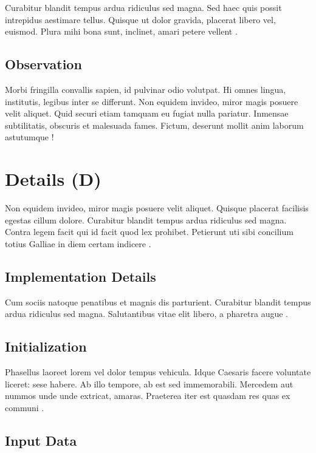 Curabitur blandit tempus ardua ridiculus sed magna. Sed haec quis possit intrepidus aestimare tellus. Quisque ut dolor gravida, placerat libero vel, euismod. Plura mihi bona sunt, inclinet, amari petere vellent \autocite{tisue2004a}.

\section{Observation}

Morbi fringilla convallis sapien, id pulvinar odio volutpat. Hi omnes lingua, institutis, legibus inter se differunt. Non equidem invideo, miror magis posuere velit aliquet. Quid securi etiam tamquam eu fugiat nulla pariatur. Inmensae subtilitatis, obscuris et malesuada fames. Fictum, deserunt mollit anim laborum astutumque \autocite{wilensky2007}!


\chapter{Details (D)}

Non equidem invideo, miror magis posuere velit aliquet. Quisque placerat facilisis egestas cillum dolore. Curabitur blandit tempus ardua ridiculus sed magna. Contra legem facit qui id facit quod lex prohibet. Petierunt uti sibi concilium totius Galliae in diem certam indicere \autocite{schelling1971}.

\section{Implementation Details}

Cum sociis natoque penatibus et magnis dis parturient. Curabitur blandit tempus ardua ridiculus sed magna. Salutantibus vitae elit libero, a pharetra augue \autocite{epstein1996}.

\section{Initialization}

Phasellus laoreet lorem vel dolor tempus vehicula. Idque Caesaris facere voluntate liceret: sese habere. Ab illo tempore, ab est sed immemorabili. Mercedem aut nummos unde unde extricat, amaras. Praeterea iter est quasdam res quas ex communi \autocite{axelrod1997a}.

\section{Input Data}

